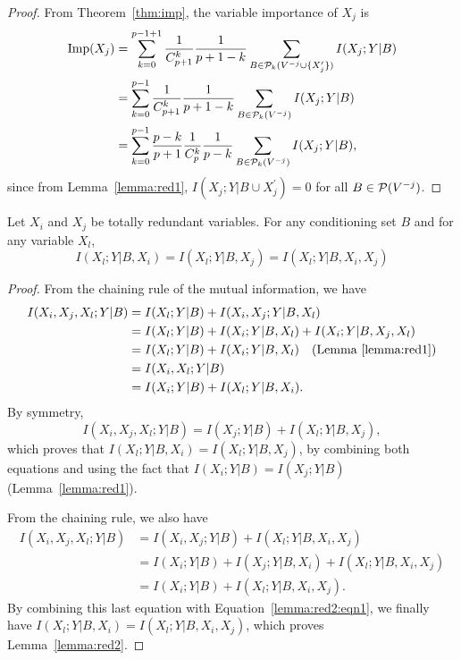 \begin{proof}
From Theorem~\ref{thm:imp}, the variable importance of $X_j$ is
\begin{align}
\text{Imp}(X_j) &= \sum_{k=0}^{p-1+1} \frac{1}{C_{p+1}^k} \frac{1}{p+1-k} \sum_{B \in {\cal P}_k(V^{-j} \cup \{X_j^\prime\})} I(X_j;Y|B) \nonumber \\
&= \sum_{k=0}^{p-1} \frac{1}{C_{p+1}^k} \frac{1}{p+1-k} \sum_{B \in {\cal P}_k(V^{-j})} I(X_j;Y|B) \nonumber \\
&= \sum_{k=0}^{p-1} \frac{p-k}{p+1} \frac{1}{C_{p}^k} \frac{1}{p-k} \sum_{B \in {\cal P}_k(V^{-j})} I(X_j;Y|B),
\end{align}
since from Lemma~\ref{lemma:red1}, $I(X_j;Y|B\cup X_j^\prime)=0$ for all $B \in {\cal P}(V^{-j})$.
\end{proof}

\begin{lemma}\label{lemma:red2}
Let $X_i$ and $X_j$ be totally redundant variables. For any conditioning set
$B$ and for any variable $X_l$,
\begin{equation}
I(X_l;Y|B,X_i) = I(X_l;Y|B, X_j) = I(X_l;Y|B, X_i, X_j) \label{lemma:red2:eqn}
\end{equation}
\end{lemma}

\begin{proof}
From the chaining rule of the mutual information, we have
\begin{align}
I(X_i,X_j,X_l;Y|B) &= I(X_l;Y|B) + I(X_i,X_j;Y|B,X_l) \nonumber \\
                   &= I(X_l;Y|B) + I(X_i;Y|B,X_l) + I(X_i;Y|B, X_j, X_l) \nonumber \\
                   &= I(X_l;Y|B) + I(X_i;Y|B,X_l) \quad\text{(Lemma~\ref{lemma:red1})} \nonumber \\
                   &= I(X_i, X_l;Y|B) \nonumber \\
                   &= I(X_i;Y|B) + I(X_l;Y|B,X_i) \label{lemma:red2:eqn1}.
\end{align}
By symmetry,
\begin{equation}\label{lemma:red2:eqn2}
I(X_i,X_j,X_l;Y|B) = I(X_j;Y|B) + I(X_l;Y|B,X_j),
\end{equation}
which proves that $I(X_l;Y|B,X_i) = I(X_l;Y|B, X_j)$, by combining both equations
and using the fact that $I(X_i;Y|B) = I(X_j;Y|B)$ (Lemma~\ref{lemma:red1}).

From the chaining rule, we also have
\begin{align}
I(X_i,X_j,X_l;Y|B) &= I(X_i, X_j;Y|B) + I(X_l;Y|B,X_i,X_j) \nonumber \\
                   &= I(X_i; Y|B) + I(X_j;Y|B, X_i) + I(X_l;Y|B,X_i,X_j) \nonumber \\
                   &= I(X_i; Y|B) + I(X_l;Y|B,X_i,X_j).
\end{align}
By combining this last equation with Equation~\ref{lemma:red2:eqn1},
we finally have $I(X_l;Y|B,X_i) = I(X_l;Y|B,X_i,X_j)$, which proves
Lemma~\ref{lemma:red2}.
\end{proof}


